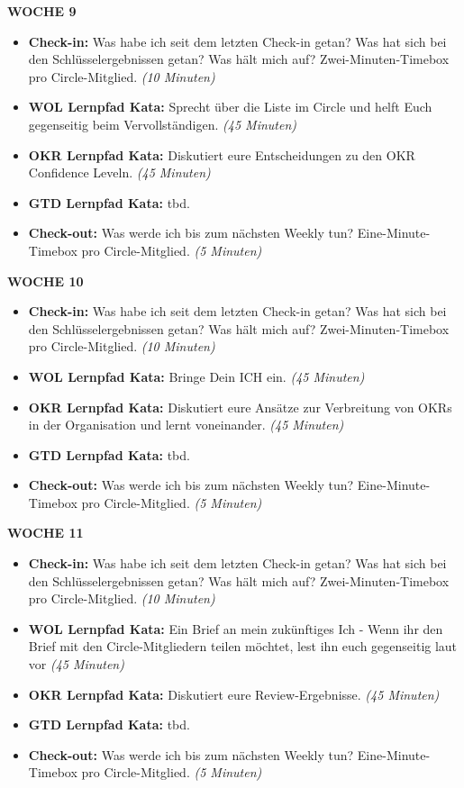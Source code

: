 \documentclass[
  ngerman,
  paper=a4,
,captions=tableheading
]{scrartcl}
\providecommand{\tightlist}{%
  \setlength{\itemsep}{0pt}\setlength{\parskip}{0pt}}
\begin{document}
\textbf{WOCHE 9}

\begin{itemize}
\tightlist
\item
  \textbf{Check-in:} Was habe ich seit dem letzten Check-in getan? Was
  hat sich bei den Schlüsselergebnissen getan? Was hält mich auf?
  Zwei-Minuten-Timebox pro Circle-Mitglied. \emph{(10 Minuten)}
\item
  \textbf{WOL Lernpfad Kata:} Sprecht über die Liste im Circle und helft
  Euch gegenseitig beim Vervollständigen. \emph{(45 Minuten)}
\item
  \textbf{OKR Lernpfad Kata:} Diskutiert eure Entscheidungen zu den OKR
  Confidence Leveln. \emph{(45 Minuten)}
\item
  \textbf{GTD Lernpfad Kata:} tbd.
\item
  \textbf{Check-out:} Was werde ich bis zum nächsten Weekly tun?
  Eine-Minute-Timebox pro Circle-Mitglied. \emph{(5 Minuten)}
\end{itemize}

\textbf{WOCHE 10}

\begin{itemize}
\tightlist
\item
  \textbf{Check-in:} Was habe ich seit dem letzten Check-in getan? Was
  hat sich bei den Schlüsselergebnissen getan? Was hält mich auf?
  Zwei-Minuten-Timebox pro Circle-Mitglied. \emph{(10 Minuten)}
\item
  \textbf{WOL Lernpfad Kata:} Bringe Dein ICH ein. \emph{(45 Minuten)}
\item
  \textbf{OKR Lernpfad Kata:} Diskutiert eure Ansätze zur Verbreitung
  von OKRs in der Organisation und lernt voneinander. \emph{(45
  Minuten)}
\item
  \textbf{GTD Lernpfad Kata:} tbd.
\item
  \textbf{Check-out:} Was werde ich bis zum nächsten Weekly tun?
  Eine-Minute-Timebox pro Circle-Mitglied. \emph{(5 Minuten)}
\end{itemize}

\textbf{WOCHE 11}

\begin{itemize}
\tightlist
\item
  \textbf{Check-in:} Was habe ich seit dem letzten Check-in getan? Was
  hat sich bei den Schlüsselergebnissen getan? Was hält mich auf?
  Zwei-Minuten-Timebox pro Circle-Mitglied. \emph{(10 Minuten)}
\item
  \textbf{WOL Lernpfad Kata:} Ein Brief an mein zukünftiges Ich - Wenn
  ihr den Brief mit den Circle-Mitgliedern teilen möchtet, lest ihn euch
  gegenseitig laut vor \emph{(45 Minuten)}
\item
  \textbf{OKR Lernpfad Kata:} Diskutiert eure Review-Ergebnisse.
  \emph{(45 Minuten)}
\item
  \textbf{GTD Lernpfad Kata:} tbd.
\item
  \textbf{Check-out:} Was werde ich bis zum nächsten Weekly tun?
  Eine-Minute-Timebox pro Circle-Mitglied. \emph{(5 Minuten)}
\end{itemize}
\end{document}
